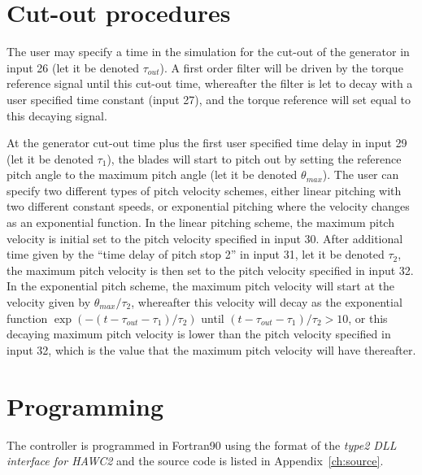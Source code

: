\section{Cut-out procedures} \label{s:cutout}

The user may specify a time in the simulation for the cut-out of the generator in input 26 (let it be denoted $\tau_{out}$). A first order filter will be driven by the torque reference signal until this cut-out time, whereafter the filter is let to decay with a user specified time constant (input 27), and the torque reference will set equal to this decaying signal.

At the generator cut-out time plus the first user specified time delay in input 29 (let it be denoted $\tau_1$), the blades will start to pitch out by setting the reference pitch angle to the maximum pitch angle (let it be denoted $\theta_{max}$). The user can specify two different types of pitch velocity schemes, either linear pitching with two different constant speeds, or exponential pitching where the velocity changes as an exponential function. In the linear pitching scheme, the maximum pitch velocity is initial set to the pitch velocity specified in input 30. After additional time given by the ``time delay of pitch stop 2'' in input 31, let it be denoted $\tau_2$, the maximum pitch velocity is then set to the pitch velocity specified in input 32. In the exponential pitch scheme, the maximum pitch velocity will start at the velocity given by $\theta_{max}/\tau_2$, whereafter this velocity will decay as the exponential function $\exp\left(-(t-\tau_{out}-\tau_1)/\tau_2\right)$ until $(t-\tau_{out}-\tau_1)/\tau_2>10$, or this decaying maximum pitch velocity is lower than the pitch velocity specified in input 32, which is the value that the maximum pitch velocity will have thereafter.

\section{Programming}

The controller is programmed in Fortran90 using the format of the \emph{type2 DLL interface for HAWC2} \cite{Larsen12} and the source code is listed in Appendix~\ref{ch:source}. 